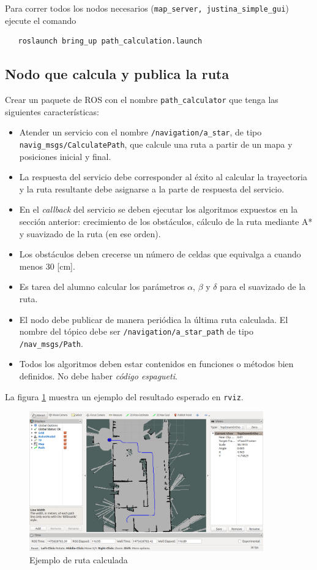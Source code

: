 \documentclass[letterpaper,12pt]{article}
\begin{document}
Para correr todos los nodos necesarios (\texttt{map\_server, justina\_simple\_gui}) ejecute el comando
\begin{verbatim}
   roslaunch bring_up path_calculation.launch
\end{verbatim}

\subsection{Nodo que calcula y publica la ruta}
Crear un paquete de ROS con el nombre \texttt{path\_calculator} que tenga las siguientes características:
\begin{itemize}
\item Atender un servicio con el nombre \texttt{/navigation/a\_star}, de tipo \texttt{navig\_msgs/CalculatePath}, que calcule una ruta a partir de un mapa y posiciones inicial y final. 
\item La respuesta del servicio debe corresponder al éxito al calcular la trayectoria y la ruta resultante debe asignarse a la parte de respuesta del servicio.
\item En el \textit{callback} del servicio se deben ejecutar los algoritmos expuestos en la sección anterior: crecimiento de los obstáculos, cálculo de la ruta mediante A* y suavizado de la ruta (en ese orden).
\item Los obstáculos deben crecerse un número de celdas que equivalga a cuando menos 30 [cm].
\item Es tarea del alumno calcular los parámetros $\alpha$, $\beta$ y $\delta$ para el suavizado de la ruta.
\item El nodo debe publicar de manera periódica la última ruta calculada. El nombre del tópico debe ser \texttt{/navigation/a\_star\_path} de tipo \texttt{/nav\_msgs/Path}.
\item Todos los algoritmos deben estar contenidos en funciones o métodos bien definidos. No debe haber \textit{código espagueti}.
\end{itemize}

La figura \ref{fig:path} muestra un ejemplo del resultado esperado en \texttt{rviz}.
\begin{figure}
\centering
\includegraphics[width=0.9\textwidth]{Figures/Path.png}
\caption{Ejemplo de ruta calculada}
\label{fig:path}
\end{figure}
\end{document}
